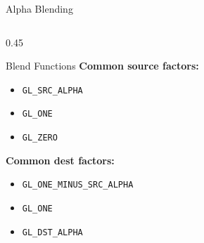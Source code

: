 \begin{frame}{Alpha Blending}
\begin{columns}
\begin{column}{0.45\textwidth}
\begin{center}
      \end{center}

      \begin{mathbox}{Blend Functions}
        \scriptsize
        \textbf{Common source factors:}
        \begin{itemize}
          \item \texttt{GL\_SRC\_ALPHA}
          \item \texttt{GL\_ONE}
          \item \texttt{GL\_ZERO}
        \end{itemize}

        \textbf{Common dest factors:}
        \begin{itemize}
          \item \texttt{GL\_ONE\_MINUS\_SRC\_ALPHA}
          \item \texttt{GL\_ONE}
          \item \texttt{GL\_DST\_ALPHA}
        \end{itemize}
      \end{mathbox}
    \end{column}
  \end{columns}
\end{frame}

